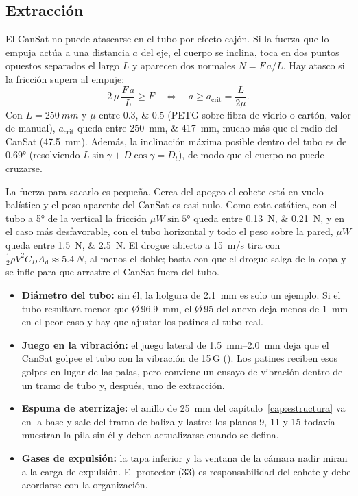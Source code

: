 \subsection{Extracción}

El CanSat no puede atascarse en el tubo por efecto cajón. Si la fuerza que lo empuja actúa a
una distancia $a$ del eje, el cuerpo se inclina, toca en dos puntos opuestos separados el
largo $L$ y aparecen dos normales $N=F\,a/L$. Hay atasco si la fricción supera al empuje:
\begin{equation}
  2\,\mu\,\frac{F\,a}{L} \ge F \quad\Longleftrightarrow\quad a \ge a_\text{crit}=\frac{L}{2\mu}.
  \label{eq:planos-cajon}
\end{equation}
Con $L=\SI{250}{mm}$ y $\mu$ entre \numlist{0.3;0.5} (PETG sobre fibra de vidrio o cartón,
valor de manual), $a_\text{crit}$ queda entre \SIlist{250;417}{mm}, mucho más que el radio del
CanSat (\SI{47.5}{mm}). Además, la inclinación máxima posible dentro del tubo es de
\ang{0.69} (resolviendo $L\sin\gamma + D\cos\gamma = D_t$), de modo que el cuerpo no puede
cruzarse.

La fuerza para sacarlo es pequeña. Cerca del apogeo el cohete está en vuelo balístico y
el peso aparente del CanSat es casi nulo. Como cota estática, con el tubo a \ang{5} de la
vertical la fricción $\mu W\sin\ang{5}$ queda entre \SIlist{0.13;0.21}{N}, y en el caso
más desfavorable, con el tubo horizontal y todo el peso sobre la pared, $\mu W$ queda
entre \SIlist{1.5;2.5}{N}. El drogue abierto a \SI{15}{m/s} tira con
$\tfrac12\rho V^2 C_D A_\text{d}\approx\SI{5.4}{N}$, al menos el doble; basta con que el
drogue salga de la copa y se infle para que arrastre el CanSat fuera del tubo.

\begin{nota}
\begin{itemize}[leftmargin=*]
  \item \textbf{Diámetro del tubo:} sin él, la holgura de \SI{2.1}{mm} es solo un
        ejemplo. Si el tubo resultara menor que Ø\,\SI{96.9}{mm}, el Ø\,95 del anexo deja
        menos de \SI{1}{mm} en el peor caso y hay que ajustar los patines al tubo real.
  \item \textbf{Juego en la vibración:} el juego lateral de \SIrange{1.5}{2.0}{mm} deja
        que el CanSat golpee el tubo con la vibración de 15\,G (). Los patines
        reciben esos golpes en lugar de las palas, pero conviene un ensayo de vibración
        dentro de un tramo de tubo y, después, uno de extracción.
  \item \textbf{Espuma de aterrizaje:} el anillo de \SI{25}{mm} del
        capítulo~\ref{cap:estructura} va en la base y sale del tramo de baliza y lastre;
        los planos 9, 11 y 15 todavía muestran la pila sin él y deben actualizarse cuando
        se defina.
  \item \textbf{Gases de expulsión:} la tapa inferior y la ventana de la cámara nadir
        miran a la carga de expulsión. El protector (33) es responsabilidad del cohete y
        debe acordarse con la organización.
\end{itemize}
\end{nota}

